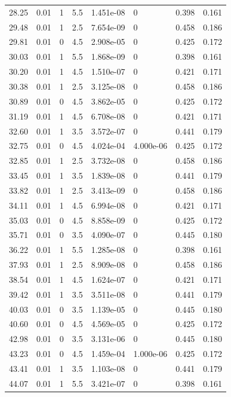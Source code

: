 \documentclass[preview]{standalone}
\begin{document}
{{{\begin{tabular}{L{1.2cm}C{1.2cm} C{0.3cm}C{0.5cm} C{1.4cm}C{1.4cm} C{1.4cm}C{1.4cm}}
  28.25  &  0.01  & 1     & 5.5 &  1.451e-08  & 0  & 0.398 &  0.161   \\ 
  29.48  &  0.01  & 1     & 2.5 &  7.654e-09  & 0  & 0.458 &  0.186   \\ 
  29.81  &  0.01  & 0     & 4.5 &  2.908e-05  & 0  & 0.425 &  0.172   \\ 
  30.03  &  0.01  & 1     & 5.5 &  1.868e-09  & 0  & 0.398 &  0.161   \\ 
  30.20  &  0.01  & 1     & 4.5 &  1.510e-07  & 0  & 0.421 &  0.171   \\ 
  30.38  &  0.01  & 1     & 2.5 &  3.125e-08  & 0  & 0.458 &  0.186   \\ 
  30.89  &  0.01  & 0     & 4.5 &  3.862e-05  & 0  & 0.425 &  0.172   \\ 
  31.19  &  0.01  & 1     & 4.5 &  6.708e-08  & 0  & 0.421 &  0.171   \\ 
  32.60  &  0.01  & 1     & 3.5 &  3.572e-07  & 0  & 0.441 &  0.179   \\ 
  32.75  &  0.01  & 0     & 4.5 &  4.024e-04  & 4.000e-06  & 0.425 &  0.172   \\ 
  32.85  &  0.01  & 1     & 2.5 &  3.732e-08  & 0  & 0.458 &  0.186   \\ 
  33.45  &  0.01  & 1     & 3.5 &  1.839e-08  & 0  & 0.441 &  0.179   \\ 
  33.82  &  0.01  & 1     & 2.5 &  3.413e-09  & 0  & 0.458 &  0.186   \\ 
  34.11  &  0.01  & 1     & 4.5 &  6.994e-08  & 0  & 0.421 &  0.171   \\ 
  35.03  &  0.01  & 0     & 4.5 &  8.858e-09  & 0  & 0.425 &  0.172   \\ 
  35.71  &  0.01  & 0     & 3.5 &  4.090e-07  & 0  & 0.445 &  0.180   \\ 
  36.22  &  0.01  & 1     & 5.5 &  1.285e-08  & 0  & 0.398 &  0.161   \\ 
  37.93  &  0.01  & 1     & 2.5 &  8.909e-08  & 0  & 0.458 &  0.186   \\ 
  38.54  &  0.01  & 1     & 4.5 &  1.624e-07  & 0  & 0.421 &  0.171   \\ 
  39.42  &  0.01  & 1     & 3.5 &  3.511e-08  & 0  & 0.441 &  0.179   \\ 
  40.03  &  0.01  & 0     & 3.5 &  1.139e-05  & 0  & 0.445 &  0.180   \\ 
  40.60  &  0.01  & 0     & 4.5 &  4.569e-05  & 0  & 0.425 &  0.172   \\ 
  42.98  &  0.01  & 0     & 3.5 &  3.131e-06  & 0  & 0.445 &  0.180   \\ 
  43.23  &  0.01  & 0     & 4.5 &  1.459e-04  & 1.000e-06  & 0.425 &  0.172   \\ 
  43.41  &  0.01  & 1     & 3.5 &  1.103e-08  & 0  & 0.441 &  0.179   \\ 
  44.07  &  0.01  & 1     & 5.5 &  3.421e-07  & 0  & 0.398 &  0.161   \\ 
\hline 
\end{tabular} 

}}}
\end{document}

